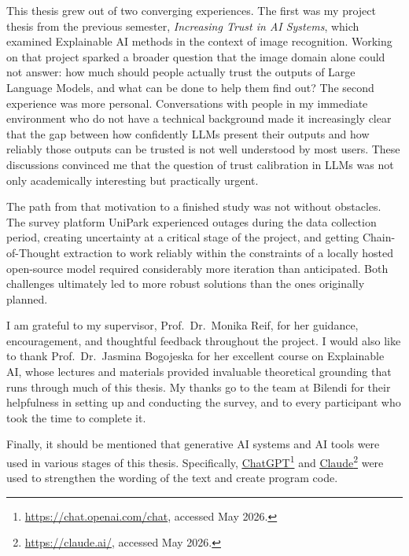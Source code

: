 This thesis grew out of two converging experiences. The first was my project thesis from the
previous semester, \textit{Increasing Trust in AI Systems}, which examined Explainable AI
methods in the context of image recognition. Working on that project sparked a broader
question that the image domain alone could not answer: how much should people actually trust
the outputs of Large Language Models, and what can be done to help them find out? The
second experience was more personal. Conversations with people in my immediate environment
who do not have a technical background made it increasingly clear that the gap between how
confidently LLMs present their outputs and how reliably those outputs can be trusted is not
well understood by most users. These discussions convinced me that the question of trust
calibration in LLMs was not only academically interesting but practically urgent.

The path from that motivation to a finished study was not without obstacles. The survey
platform UniPark experienced outages during the data collection period, creating uncertainty
at a critical stage of the project, and getting Chain-of-Thought extraction to work reliably
within the constraints of a locally hosted open-source model required considerably more
iteration than anticipated. Both challenges ultimately led to more robust solutions than the
ones originally planned.

I am grateful to my supervisor, Prof.\ Dr.\ Monika Reif, for her guidance, encouragement,
and thoughtful feedback throughout the project. I would also like to thank Prof.\ Dr.\ Jasmina
Bogojeska for her excellent course on Explainable AI, whose lectures and materials provided
invaluable theoretical grounding that runs through much of this thesis. My thanks go to the
team at Bilendi for their helpfulness in setting up and conducting the survey, and to every
participant who took the time to complete it.

Finally, it should be mentioned that generative AI systems and AI tools were used in various stages of this thesis. Specifically, \href{https://chat.openai.com/chat}{\underline{ChatGPT}}\footnote{\url{https://chat.openai.com/chat}, accessed May 2026.} and \href{https://claude.ai/}{\underline{Claude}}\footnote{\url{https://claude.ai/}, accessed May 2026.} were used to strengthen the wording of the text and create program code.